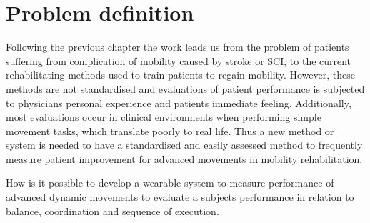\section{Problem definition}

Following the previous chapter the work leads us from the problem of patients suffering from complication of mobility caused by stroke or SCI, to the current rehabilitating methods used to train patients to regain mobility. 
However, these methods are not standardised and evaluations of patient performance is subjected to physicians personal experience and patients immediate feeling. Additionally, most evaluations occur in clinical environments when performing simple movement tasks, which translate poorly to real life. 
Thus a new method or system is needed to have a standardised and easily assessed method to frequently measure patient improvement for advanced movements in mobility rehabilitation.

\begin{center}
How is it possible to develop a wearable system to measure performance of advanced dynamic movements to evaluate a subjects performance in relation to balance, coordination and sequence of execution.
\end{center}

